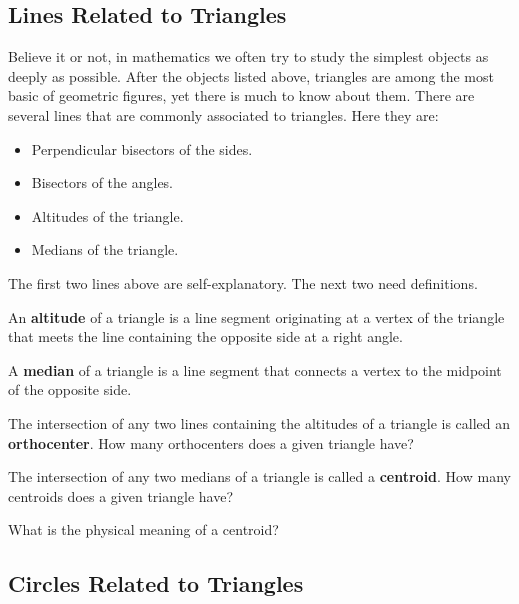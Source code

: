 \subsection{Lines Related to Triangles}

Believe it or not, in mathematics we often try to study the simplest
objects as deeply as possible. After the objects listed above,
triangles are among the most basic of geometric figures, yet there is
much to know about them.  There are several lines that are commonly
associated to triangles. Here they are:
\begin{itemize}
\item Perpendicular bisectors of the sides.
\item Bisectors of the angles.
\item Altitudes of the triangle.
\item Medians of the triangle. 
\end{itemize}

The first two lines above are self-explanatory. The next two need definitions.

\begin{dfn} 
An \textbf{altitude} of a triangle is a line segment originating at a
vertex of the triangle that meets the line containing the opposite
side at a right angle.
\end{dfn}


\begin{dfn} 
A \textbf{median} of a triangle is a line segment that connects a
vertex to the midpoint of the opposite side.
\end{dfn}

\begin{ques} 
The intersection of any two lines containing the altitudes of a
triangle is called an \textbf{orthocenter}. How
many orthocenters does a given triangle have?
\end{ques}
\QM


\begin{ques} 
The intersection of any two medians of a triangle is called a
\textbf{centroid}. How many centroids does a given
triangle have?
\end{ques}
\QM


\begin{ques} What is the physical meaning of a centroid?
\end{ques}
\QM




\subsection{Circles Related to Triangles}


